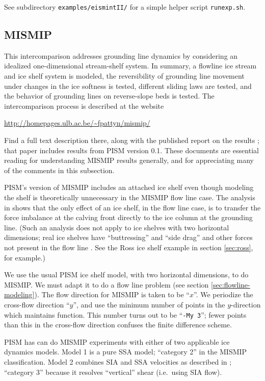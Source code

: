 See subdirectory \verb|examples/eismintII/| for a simple helper script \verb|runexp.sh|.


\subsection{MISMIP}\label{subsect:MISMIP}

This intercomparison addresses grounding line dynamics by considering an idealized one-dimensional stream-shelf system.  In summary, a flowline ice stream and ice shelf system is modeled, the reversibility of grounding line movement under changes in the ice softness is tested, different sliding laws are tested, and the behavior of grounding lines on reverse-slope beds is tested.  The intercomparison process is described at the website

\centerline{\url{http://homepages.ulb.ac.be/~fpattyn/mismip/}}

\noindent Find a full text description there, along with the published report on the results \cite{MISMIP2012}; that paper includes results from PISM version 0.1.  These documents are essential reading for understanding MISMIP results generally, and for appreciating many of the comments in this subsection.

PISM's version of MISMIP includes an attached ice shelf even though modeling the shelf is theoretically unnecessary in the MISMIP flow line case.  The analysis in \cite{SchoofMarine1} shows that the only effect of an ice shelf, in the flow line case, is to transfer the force imbalance at the calving front directly to the ice column at the grounding line.  (Such an analysis does not apply to ice shelves with two horizontal dimensions; real ice shelves have ``buttressing'' and ``side drag'' and other forces not present in the flow line \cite{Goldbergetal2009}.  See the Ross ice shelf example in section \ref{sec:ross}, for example.)

We use the usual PISM ice shelf model, with two horizontal dimensions, to do MISMIP.  We must adapt it to do a flow line problem (see section \ref{sec:flowline-modeling}).  The flow direction for MISMIP is taken to be ``$x$''.  We periodize the cross-flow direction ``$y$'', and use the minimum number of points in the $y$-direction which maintains function.  This number turns out to be ``\texttt{-My 3}''; fewer points than this in the cross-flow direction confuses the finite difference scheme.

PISM has can do MISMIP experiments with either of two applicable ice dynamics models.  Model 1 is a pure SSA model; ``category 2'' in the MISMIP classification.  Model 2 combines SIA and SSA velocities as described in \cite{Winkelmannetal2011}; ``category 3'' because it resolves ``vertical'' shear (i.e.~using SIA flow).

